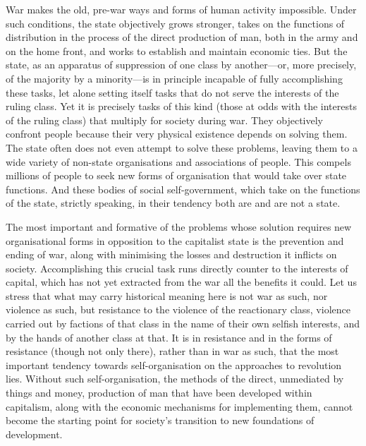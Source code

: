 \documentclass[../main]{subfiles}
\begin{document}
War makes the old, pre-war ways and forms of human activity impossible. Under such conditions, the state objectively grows stronger, takes on the functions of distribution in the process of the direct production of man, both in the army and on the home front, and works to establish and maintain economic ties. But the state, as an apparatus of suppression of one class by another—or, more precisely, of the majority by a minority—is in principle incapable of fully accomplishing these tasks, let alone setting itself tasks that do not serve the interests of the ruling class. Yet it is precisely tasks of this kind (those at odds with the interests of the ruling class) that multiply for society during war. They objectively confront people because their very physical existence depends on solving them. The state often does not even attempt to solve these problems, leaving them to a wide variety of non-state organisations and associations of people. This compels millions of people to seek new forms of organisation that would take over state functions. And these bodies of social self-government, which take on the functions of the state, strictly speaking, in their tendency both are and are not a state.

The most important and formative of the problems whose solution requires new organisational forms in opposition to the capitalist state is the prevention and ending of war, along with minimising the losses and destruction it inflicts on society. Accomplishing this crucial task runs directly counter to the interests of capital, which has not yet extracted from the war all the benefits it could. Let us stress that what may carry historical meaning here is not war as such, nor violence as such, but resistance to the violence of the reactionary class, violence carried out by factions of that class in the name of their own selfish interests, and by the hands of another class at that. It is in resistance and in the forms of resistance (though not only there), rather than in war as such, that the most important tendency towards self-organisation on the approaches to revolution lies. Without such self-organisation, the methods of the direct, unmediated by things and money, production of man that have been developed within capitalism, along with the economic mechanisms for implementing them, cannot become the starting point for society’s transition to new foundations of development.
\end{document}
